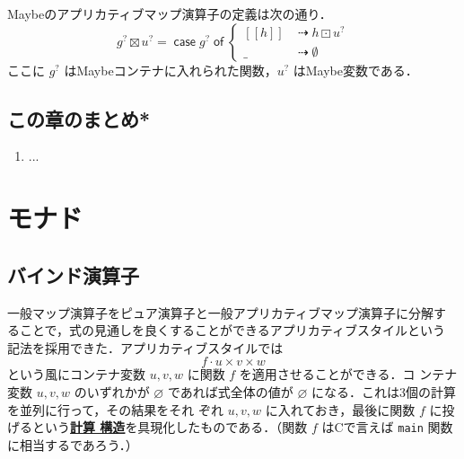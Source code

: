 \documentclass[a5paper,twoside,fleqn,draft]{jsbook}
\def\[{[\![}
\def\]{]\!]}
\newcommand{\programminglanguage}[1]{\textsf{#1}}
\newcommand{\clang}{\programminglanguage{C}}
\newcommand{\keyword}[1]{{\underline{\textbf{#1}}}}
\newcommand{\code}[1]{\texttt{#1}}
\newcommand{\mKeyword}[1]{\mathsf{#1}}
\newcommand{\mIfKeyword}{\mKeyword{if}}
\newcommand{\mCaseKeyword}{\mKeyword{case}}
\newcommand{\mOfKeyword}{\mKeyword{of}}
\newcommand{\mOtherwiseKeyword}{\mKeyword{otherwise}}
\DeclareMathOperator{\mCaseKW}{\mCaseKeyword}
\DeclareMathOperator{\mIf}{\mIfKeyword}
\DeclareMathOperator{\mOfKW}{\mOfKeyword}
\DeclareMathOperator{\mOtherwise}{\mOtherwiseKeyword}
\newcommand{\mNothing}{\emptyset}
\newcommand{\mPureNothing}{\varnothing}
\DeclareMathOperator{\mAppMap}{\times}
\DeclareMathOperator{\mAppMapMaybe}{\boxtimes}
\DeclareMathOperator{\mIfSo}{\dashrightarrow}
\DeclareMathOperator{\mLogicalAnd}{\wedge}
\DeclareMathOperator{\mMap}{\cdot}
\DeclareMathOperator{\mMapMaybe}{\boxdot}
\newcommand{\mValueConstructor}[1]{\mathrm{#1}}
\newcommand{\mValueWith}[2]{{}^\mValueConstructor{#1}\[#2\]}
\newcommand{\mJustWith}[1]{\[#1\]}%
\newcommand{\mMaybe}[1]{{#1}^?}
\newcommand{\mCaseOf}[1]{\mCaseKW#1\mOfKW}
\begin{document}
Maybeのアプリカティブマップ演算子の定義は次の通り．
\begin{equation}
\label{eq:maybe-applicative-map-by-maybe-map}
\mMaybe{g}\mAppMapMaybe\mMaybe{u}
=\mCaseOf{\mMaybe{g}}
\begin{cases}
\mJustWith{h}&\mIfSo h\mMapMaybe\mMaybe{u}\\
\_&\mIfSo\mNothing
\end{cases}
\end{equation}
ここに $\mMaybe{g}$ はMaybeコンテナに入れられた関数，$\mMaybe{u}$ はMaybe変数である．

\section{この章のまとめ*}

\begin{enumerate}
\item ...
\end{enumerate}

\chapter{モナド}
\label{ch:monad}

\section{バインド演算子}

一般マップ演算子をピュア演算子と一般アプリカティブマップ演算子に分解す
ることで，式の見通しを良くすることができるアプリカティブスタイルという
記法を採用できた．アプリカティブスタイルでは
\begin{equation}
  f\mMap u\mAppMap v\mAppMap w
\end{equation}
という風にコンテナ変数 $u,v,w$ に関数 $f$ を適用させることができる．コ
ンテナ変数 $u,v,w$ のいずれかが $\mPureNothing$ であれば式全体の値が
$\mPureNothing$ になる．これは3個の計算を並列に行って，その結果をそれ
ぞれ $u,v,w$ に入れておき，最後に関数 $f$ に投げるという\keyword{計算
構造}を具現化したものである．（関数 $f$ は\clang で言えば
\code{main} 関数に相当するであろう．）
\end{document}
